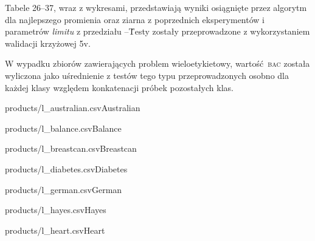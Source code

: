 	
\begin{table*}[htb]
     \parbox{.65\linewidth}{
    
	    Tabele 26--37, wraz z wykresami, przedstawiają wyniki osiągnięte przez algorytm dla najlepszego promienia oraz ziarna z poprzednich eksperymentów i parametrów \emph{limitu} z przedziału --\. Testy zostały przeprowadzone z wykorzystaniem walidacji krzyżowej \oldstylenums5v.
    	
    	W wypadku zbiorów zawierających problem wieloetykietowy, wartość \textsc{bac} została wyliczona jako uśrednienie z testów tego typu przeprowadzonych osobno dla każdej klasy względem konkatenacji próbek pozostałych klas.
    }\hfill
    \parbox{.32\linewidth}{
	    \begin{ridel}{products/l_australian.csv}{Australian}\end{ridel}
	}
\end{table*}

\begin{table*}[!ht]
    
    \parbox{.32\linewidth}{
	    \begin{ridel}{products/l_balance.csv}{Balance}\end{ridel}
	}
	\hfill
    \parbox{.32\linewidth}{
	    \begin{ridel}{products/l_breastcan.csv}{Breastcan}\end{ridel}
	}
	\hfill
    \parbox{.32\linewidth}{
	    \begin{ridel}{products/l_diabetes.csv}{Diabetes}\end{ridel}
	}
\end{table*}


\begin{table*}[!ht]
    \parbox{.32\linewidth}{
	    \begin{ridel}{products/l_german.csv}{German}\end{ridel}
	}
	\hfill
    \parbox{.32\linewidth}{
	    \begin{ridel}{products/l_hayes.csv}{Hayes}\end{ridel}
	}
	\hfill
    \parbox{.32\linewidth}{
	    \begin{ridel}{products/l_heart.csv}{Heart}\end{ridel}
	}
\end{table*}

